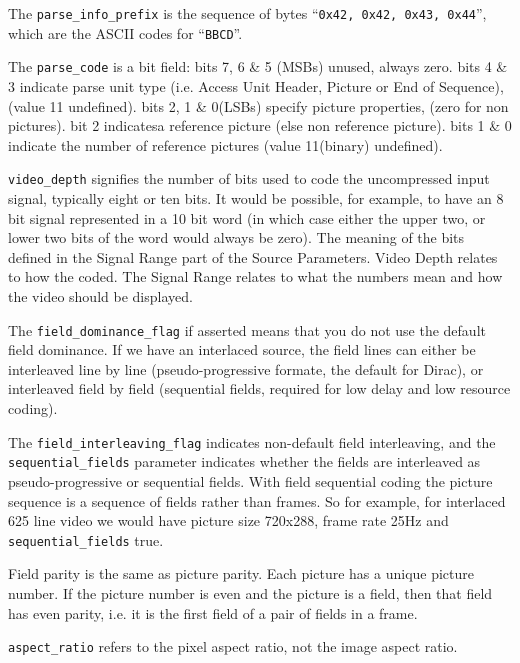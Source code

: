 
The \verb|parse_info_prefix| is the sequence of bytes
``\verb|0x42, 0x42, 0x43, 0x44|'', which are the ASCII codes for ``\verb|BBCD|''.

The \verb|parse_code| is a bit field:
bits 7, 6 \& 5 (MSBs) unused, always zero.
bits 4 \& 3 indicate parse unit type (i.e. Access Unit Header, Picture
or End of Sequence), (value 11 undefined).
bits 2, 1 \& 0(LSBs) specify picture properties, (zero for non
pictures).
bit 2 indicatesa reference picture (else non reference picture).
bits 1 \& 0 indicate the number of reference pictures (value 11(binary)
undefined).

\verb|video_depth| signifies the number of bits used to code the
uncompressed input signal, typically eight or ten bits.  It would be
possible, for example, to have an 8 bit signal represented in a 10 bit
word (in which case either the upper two, or lower two bits of the word
would always be zero).  The meaning of the bits defined in the Signal
Range part of the Source Parameters.  Video Depth relates to how the
coded.  The Signal Range relates to what the numbers mean and how the
video should be displayed.

The \verb|field_dominance_flag| if asserted means that you do not use
the default field dominance.  If we have an interlaced source, the field
lines can either be interleaved line by line (pseudo-progressive
formate, the default for Dirac), or interleaved field by field
(sequential fields, required for low delay and low resource coding).

The \verb|field_interleaving_flag| indicates non-default field
interleaving, and the \verb|sequential_fields| parameter indicates
whether the fields are interleaved as pseudo-progressive or sequential
fields.  With field sequential coding the picture sequence is a sequence
of fields rather than frames. So for example, for interlaced 625 line
video we would have picture size 720x288, frame rate 25Hz and
\verb|sequential_fields| true.

Field parity is the same as picture parity.  Each picture has a unique
picture number.  If the picture number is even and the picture is a
field, then that field has even parity, i.e. it is the first field of a
pair of fields in a frame.

\verb|aspect_ratio| refers to the pixel aspect ratio, not the image
aspect ratio.


